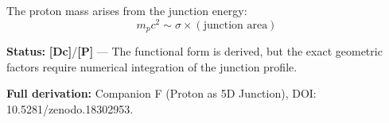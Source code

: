 \documentclass[11pt,a4paper]{article}
\newcommand{\tagP}{\textcolor{red!70!black}{\textbf{[P]}}}
\newcommand{\tagDc}{\textcolor{blue!70!black}{\textbf{[Dc]}}}
\begin{document}
\begin{center}
\end{center}

The proton mass arises from the junction energy:
\begin{equation}
    m_p c^2 \sim \sigma \times (\text{junction area})
\end{equation}

\textbf{Status:} \tagDc{}/\tagP{} --- The functional form is derived, but the exact geometric factors require numerical integration of the junction profile.

\textbf{Full derivation:} Companion F (Proton as 5D Junction), DOI: 10.5281/zenodo.18302953.
\end{document}
